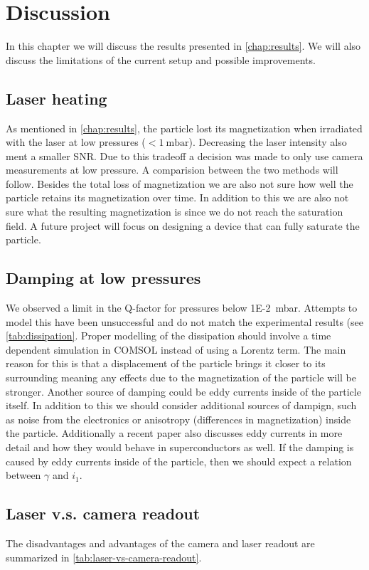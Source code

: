 \chapter{Discussion}
\label{chap:discussion}
In this chapter we will discuss the results presented in \autoref{chap:results}. We will also discuss the limitations of the current setup and possible improvements.

\section*{Laser heating}
As mentioned in \autoref{chap:results}, the particle lost its magnetization when irradiated with the laser at low pressures ($<\qty{1}{\milli\bar}$). Decreasing the laser intensity also ment a smaller SNR. Due to this tradeoff a decision was made to only use camera measurements at low pressure. A comparision between the two methods will follow. Besides the total loss of magnetization we are also not sure how well the particle retains its magnetization over time. In addition to this we are also not sure what the resulting magnetization is since we do not reach the saturation field. A future project will focus on designing a device that can fully saturate the particle.

\section*{Damping at low pressures}
We observed a limit in the Q-factor for pressures below \qty{1E-2}{\milli\bar}. Attempts to model this have been unsuccessful and do not match the experimental results (see \autoref{tab:dissipation}. Proper modelling of the dissipation should involve a time dependent simulation in COMSOL instead of using a Lorentz term. The main reason for this is that a displacement of the particle brings it closer to its surrounding meaning any effects due to the magnetization of the particle will be stronger. Another source of damping could be eddy currents inside of the particle itself. In addition to this we should consider additional sources of dampign, such as noise from the electronics or anisotropy (differences in magnetization) inside the particle\cite{millen}. Additionally a recent paper also discusses eddy currents in more detail and how they would behave in superconductors as well\cite{fuwa_stable_2023}. If the damping is caused by eddy currents inside of the particle, then we should expect a relation between $\gamma$ and $i_1$.

\section*{Laser v.s. camera readout}
The disadvantages and advantages of the camera and laser readout are summarized in \autoref{tab:laser-vs-camera-readout}.

